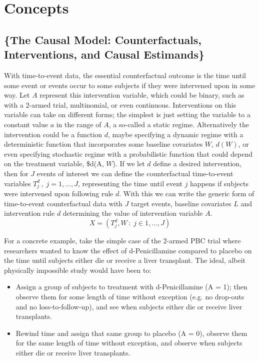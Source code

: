 \documentclass{report}
\newcommand{\1}{\ensuremath{\mathbf{1}}}
\renewcommand{\L}{\ensuremath{W}}
\begin{document}
\section{Concepts}
\label{sec:org753ac6e}

\subsection{\{The Causal Model: Counterfactuals, Interventions, and Causal Estimands\}}
\label{sec:orgde3c856}
With time-to-event data, the essential counterfactual outcome is the time until some event or events occur to some subjects if they were intervened upon in some way. Let \(A\) represent this intervention variable, which could be binary, such as with a 2-armed trial, multinomial, or even continuous. Interventions on this variable can take on different forms; the simplest is just setting the variable to a constant value \(a\) in the range of \(A\), a so-called a static regime. Alternatively the intervention could be a function \(d\), maybe specifying a dynamic regime with a deterministic function that incorporates some baseline covariates \(\L\), \(d(\L)\), or even specifying stochastic regime with a probabilistic function that could depend on the treatment variable, \$d(A, \L). If we let \(d\) define a desired intervention, then for \(J\) events of interest we can define the counterfactual time-to-event variables \(T^d_j \,,\; j = 1, ..., J\), representing the time until event \(j\) happens if subjects were intervened upon following rule \(d\). With this we can write the generic form of time-to-event counterfactual data with \(J\) target events, baseline covariates \(L\) and intervention rule \(d\) determining the value of intervention variable \(A\).
\[ X = \left( T^d_j, \L \,:\; j \in 1, \dots, J \right)\]

For a concrete example, take the simple case of the 2-armed PBC trial where researchers wanted to know the effect of d-Penicillamine compared to placebo on the time until subjects either die or receive a liver transplant. The ideal, albeit physically impossible study would have been to:
\begin{itemize}
\item Assign a group of subjects to treatment with d-Penicillamine (A = 1); then observe them for some length of time without exception (e.g. no drop-outs and no loss-to-follow-up), and see when subjects either die or receive liver transplants.
\item Rewind time and assign that same group to placebo (A = 0), observe them for the same length of time without exception, and observe when subjects either die or receive liver transplants.
\end{itemize}
\end{document}

